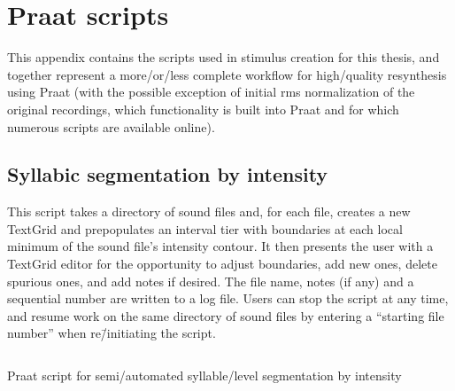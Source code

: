 \chapter{Praat scripts\label{apx:PraatScripts}}

This appendix contains the scripts used in stimulus creation for this thesis, and together represent a more\-/or\-/less complete workflow for high\-/quality \psola{} resynthesis using Praat (with the possible exception of initial \ac{rms} normalization of the original recordings, which functionality is built into Praat and for which numerous scripts are available online).

\section{Syllabic segmentation by intensity\label{scr:SyllIntens}}
This script takes a directory of sound files and, for each file, creates a new TextGrid and prepopulates an interval tier with boundaries at each local minimum of the sound file’s intensity contour.  It then presents the user with a TextGrid editor for the opportunity to adjust boundaries, add new ones, delete spurious ones, and add notes if desired.  The file name, notes (if any) and a sequential number are written to a log file.  Users can stop the script at any time, and resume work on the same directory of sound files by entering a “starting file number” when re\=/initiating the script.
\begin{code}
	\inputminted[fontsize=\footnotesize, tabsize=2]{r}{../scripts/dissversions/CreateSyllableTierFromIntensity_DissVersion.praat}
	\caption[Syllabic segmentation by intensity]{Praat script for semi\-/automated syllable\-/level segmentation by intensity\label{lst:SylInt}}
\end{code}
\newpage

